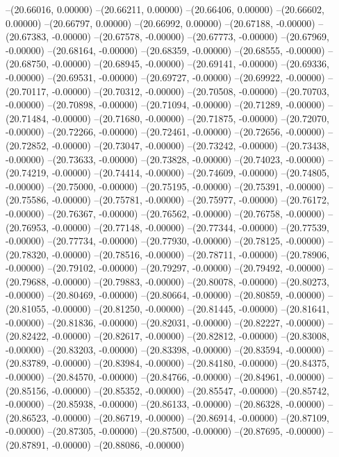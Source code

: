 --(20.66016, 0.00000)
--(20.66211, 0.00000)
--(20.66406, 0.00000)
--(20.66602, 0.00000)
--(20.66797, 0.00000)
--(20.66992, 0.00000)
--(20.67188, -0.00000)
--(20.67383, -0.00000)
--(20.67578, -0.00000)
--(20.67773, -0.00000)
--(20.67969, -0.00000)
--(20.68164, -0.00000)
--(20.68359, -0.00000)
--(20.68555, -0.00000)
--(20.68750, -0.00000)
--(20.68945, -0.00000)
--(20.69141, -0.00000)
--(20.69336, -0.00000)
--(20.69531, -0.00000)
--(20.69727, -0.00000)
--(20.69922, -0.00000)
--(20.70117, -0.00000)
--(20.70312, -0.00000)
--(20.70508, -0.00000)
--(20.70703, -0.00000)
--(20.70898, -0.00000)
--(20.71094, -0.00000)
--(20.71289, -0.00000)
--(20.71484, -0.00000)
--(20.71680, -0.00000)
--(20.71875, -0.00000)
--(20.72070, -0.00000)
--(20.72266, -0.00000)
--(20.72461, -0.00000)
--(20.72656, -0.00000)
--(20.72852, -0.00000)
--(20.73047, -0.00000)
--(20.73242, -0.00000)
--(20.73438, -0.00000)
--(20.73633, -0.00000)
--(20.73828, -0.00000)
--(20.74023, -0.00000)
--(20.74219, -0.00000)
--(20.74414, -0.00000)
--(20.74609, -0.00000)
--(20.74805, -0.00000)
--(20.75000, -0.00000)
--(20.75195, -0.00000)
--(20.75391, -0.00000)
--(20.75586, -0.00000)
--(20.75781, -0.00000)
--(20.75977, -0.00000)
--(20.76172, -0.00000)
--(20.76367, -0.00000)
--(20.76562, -0.00000)
--(20.76758, -0.00000)
--(20.76953, -0.00000)
--(20.77148, -0.00000)
--(20.77344, -0.00000)
--(20.77539, -0.00000)
--(20.77734, -0.00000)
--(20.77930, -0.00000)
--(20.78125, -0.00000)
--(20.78320, -0.00000)
--(20.78516, -0.00000)
--(20.78711, -0.00000)
--(20.78906, -0.00000)
--(20.79102, -0.00000)
--(20.79297, -0.00000)
--(20.79492, -0.00000)
--(20.79688, -0.00000)
--(20.79883, -0.00000)
--(20.80078, -0.00000)
--(20.80273, -0.00000)
--(20.80469, -0.00000)
--(20.80664, -0.00000)
--(20.80859, -0.00000)
--(20.81055, -0.00000)
--(20.81250, -0.00000)
--(20.81445, -0.00000)
--(20.81641, -0.00000)
--(20.81836, -0.00000)
--(20.82031, -0.00000)
--(20.82227, -0.00000)
--(20.82422, -0.00000)
--(20.82617, -0.00000)
--(20.82812, -0.00000)
--(20.83008, -0.00000)
--(20.83203, -0.00000)
--(20.83398, -0.00000)
--(20.83594, -0.00000)
--(20.83789, -0.00000)
--(20.83984, -0.00000)
--(20.84180, -0.00000)
--(20.84375, -0.00000)
--(20.84570, -0.00000)
--(20.84766, -0.00000)
--(20.84961, -0.00000)
--(20.85156, -0.00000)
--(20.85352, -0.00000)
--(20.85547, -0.00000)
--(20.85742, -0.00000)
--(20.85938, -0.00000)
--(20.86133, -0.00000)
--(20.86328, -0.00000)
--(20.86523, -0.00000)
--(20.86719, -0.00000)
--(20.86914, -0.00000)
--(20.87109, -0.00000)
--(20.87305, -0.00000)
--(20.87500, -0.00000)
--(20.87695, -0.00000)
--(20.87891, -0.00000)
--(20.88086, -0.00000)
